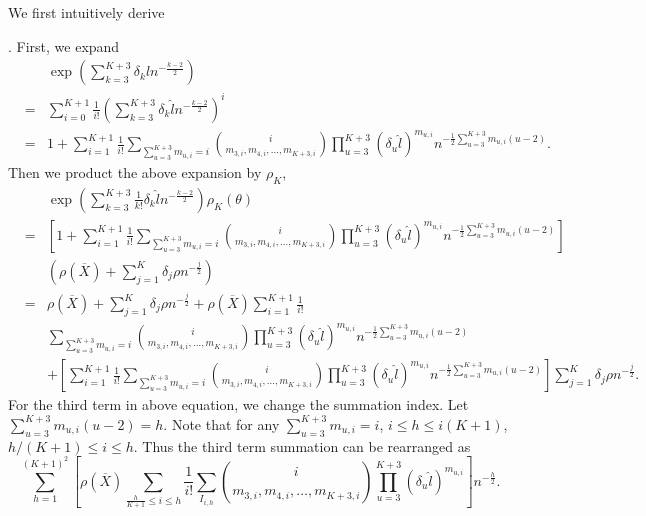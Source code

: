 \documentclass[oneside,english]{amsbook}
\numberwithin{section}{chapter}
\numberwithin{equation}{section}
\numberwithin{figure}{section}
\theoremstyle{plain}
\theoremstyle{plain}
\theoremstyle{definition}
\theoremstyle{plain}
\theoremstyle{plain}
\theoremstyle{remark}
\theoremstyle{definition}
\theoremstyle{definition}
\begin{document}
We first intuitively derive %

. First, we expand 
\begin{eqnarray*}
 &  & \exp\left(\sum_{k=3}^{K+3}\delta_{k}\hat{l}n^{-\frac{k-2}{2}}\right)\\
 & = & \sum_{i=0}^{K+1}\frac{1}{i!}\left(\sum_{k=3}^{K+3}\delta_{k}\hat{l}n^{-\frac{k-2}{2}}\right)^{i}\\
 & = & 1+\sum_{i=1}^{K+1}\frac{1}{i!}\sum_{\sum_{u=3}^{K+3}m_{u,i}=i}\binom{i}{m_{3,i},m_{4,i},\ldots,m_{K+3,i}}\prod_{u=3}^{K+3}\left(\delta_{u}\hat{l}\right)^{m_{u,i}}n^{-\frac{1}{2}\sum_{u=3}^{K+3}m_{u,i}\left(u-2\right)}.
\end{eqnarray*}
Then we product the above expansion by $\rho_{K}$, 
\begin{eqnarray*}
 &  & \exp\left(\sum_{k=3}^{K+3}\frac{1}{k!}\delta_{k}\hat{l}n^{-\frac{k-2}{2}}\right)\rho_{K}\left(\theta\right)\\
 & = & \left[1+\sum_{i=1}^{K+1}\frac{1}{i!}\sum_{\sum_{u=3}^{K+3}m_{u,i}=i}\binom{i}{m_{3,i},m_{4,i},\ldots,m_{K+3,i}}\prod_{u=3}^{K+3}\left(\delta_{u}\hat{l}\right)^{m_{u,i}}n^{-\frac{1}{2}\sum_{u=3}^{K+3}m_{u,i}\left(u-2\right)}\right]\\
 &  & \left(\rho\left(\overline{X}\right)+\sum_{j=1}^{K}\delta_{j}\rho n^{-\frac{j}{2}}\right)\\
 & = & \rho\left(\overline{X}\right)+\sum_{j=1}^{K}\delta_{j}\rho n^{-\frac{j}{2}}+\rho\left(\overline{X}\right)\sum_{i=1}^{K+1}\frac{1}{i!}\\
 &  & \sum_{\sum_{u=3}^{K+3}m_{u,i}=i}\binom{i}{m_{3,i},m_{4,i},\ldots,m_{K+3,i}}\prod_{u=3}^{K+3}\left(\delta_{u}\hat{l}\right)^{m_{u,i}}n^{-\frac{1}{2}\sum_{u=3}^{K+3}m_{u,i}\left(u-2\right)}\\
 &  & +\left[\sum_{i=1}^{K+1}\frac{1}{i!}\sum_{\sum_{u=3}^{K+3}m_{u,i}=i}\binom{i}{m_{3,i},m_{4,i},\ldots,m_{K+3,i}}\prod_{u=3}^{K+3}\left(\delta_{u}\hat{l}\right)^{m_{u,i}}n^{-\frac{1}{2}\sum_{u=3}^{K+3}m_{u,i}\left(u-2\right)}\right]\sum_{j=1}^{K}\delta_{j}\rho n^{-\frac{j}{2}}.
\end{eqnarray*}
For the third term in above equation, we change the summation index.
Let $\sum_{u=3}^{K+3}m_{u,i}\left(u-2\right)=h$. Note that for any
$\sum_{u=3}^{K+3}m_{u,i}=i$, $i\le h\le i\left(K+1\right)$, $h/\left(K+1\right)\le i\le h$.
Thus the third term summation can be rearranged as 
\[
\sum_{h=1}^{\left(K+1\right)^{2}}\left[\rho\left(\overline{X}\right)\sum_{\frac{h}{K+1}\le i\le h}\frac{1}{i!}\sum_{I_{i,h}}\binom{i}{m_{3,i},m_{4,i},\ldots,m_{K+3,i}}\prod_{u=3}^{K+3}\left(\delta_{u}\hat{l}\right)^{m_{u,i}}\right]n^{-\frac{h}{2}}.
\]
\end{document}

